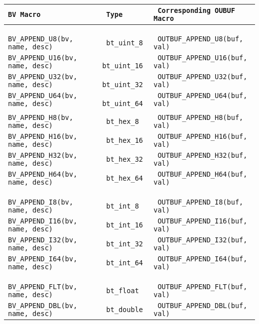\documentclass[documentation]{subfiles}
\begin{document}
\begin{longtable}{>{\tt}l>{\tt}l>{\tt}l}
    \toprule
    {\bf {\tt BV} Macro} & {\bf Type} & {\bf Corresponding {\tt OUBUF} Macro}\\
    \midrule

    \\
    \multicolumn{3}{l}{\bf Unsigned values}\\
    \\

    BV\_APPEND\_U8(bv, name, desc)  & bt\_uint\_8  & OUTBUF\_APPEND\_U8(buf, val)\\
    BV\_APPEND\_U16(bv, name, desc) & bt\_uint\_16 & OUTBUF\_APPEND\_U16(buf, val)\\
    BV\_APPEND\_U32(bv, name, desc) & bt\_uint\_32 & OUTBUF\_APPEND\_U32(buf, val)\\
    BV\_APPEND\_U64(bv, name, desc) & bt\_uint\_64 & OUTBUF\_APPEND\_U64(buf, val)\\
    \\
    BV\_APPEND\_H8(bv, name, desc)  & bt\_hex\_8  & OUTBUF\_APPEND\_H8(buf, val)\\
    BV\_APPEND\_H16(bv, name, desc) & bt\_hex\_16 & OUTBUF\_APPEND\_H16(buf, val)\\
    BV\_APPEND\_H32(bv, name, desc) & bt\_hex\_32 & OUTBUF\_APPEND\_H32(buf, val)\\
    BV\_APPEND\_H64(bv, name, desc) & bt\_hex\_64 & OUTBUF\_APPEND\_H64(buf, val)\\

    \\
    \multicolumn{3}{l}{\bf Signed values}\\
    \\

    BV\_APPEND\_I8(bv, name, desc)  & bt\_int\_8  & OUTBUF\_APPEND\_I8(buf, val)\\
    BV\_APPEND\_I16(bv, name, desc) & bt\_int\_16 & OUTBUF\_APPEND\_I16(buf, val)\\
    BV\_APPEND\_I32(bv, name, desc) & bt\_int\_32 & OUTBUF\_APPEND\_I32(buf, val)\\
    BV\_APPEND\_I64(bv, name, desc) & bt\_int\_64 & OUTBUF\_APPEND\_I64(buf, val)\\

    \\
    \multicolumn{3}{l}{\bf Floating points values}\\
    \\

    BV\_APPEND\_FLT(bv, name, desc) & bt\_float  & OUTBUF\_APPEND\_FLT(buf, val)\\
    BV\_APPEND\_DBL(bv, name, desc) & bt\_double & OUTBUF\_APPEND\_DBL(buf, val)\\


\end{longtable}
\end{document}
